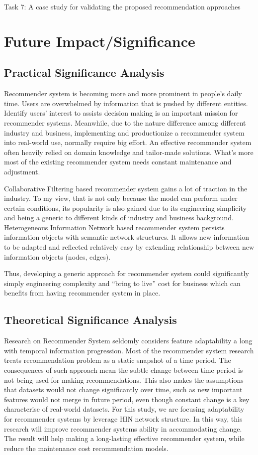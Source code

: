 \documentclass[12pt,a4 paper,title page]{article}
\begin{document}
Task 7:  A case study for validating the proposed recommendation approaches 



\section{Future Impact/Significance}

\subsection{Practical Significance Analysis}
Recommender system is becoming more and more prominent in people's daily time. Users are overwhelmed by information that is pushed by different entities. Identify users' interest to assists decision making is an important mission for recommender systems. Meanwhile, due to the nature difference among different industry and business, implementing and productionize a recommender system into real-world use, normally require big effort. An effective recommender system often heavily relied on domain knowledge and tailor-made solutions. What's more most of the existing recommender system needs constant maintenance and adjustment.  

Collaborative Filtering based recommender system gains a lot of traction in the industry. To my view, that is not only because the model can perform under certain conditions, its popularity is also gained due to its engineering simplicity and being a generic to different kinds of industry and business background. Heterogeneous Information Network based recommender system persists information objects with semantic network structures. It allows new information to be adapted and reflected relatively easy by extending relationship between new information objects (nodes, edges).  

Thus, developing a generic approach for recommender system could significantly simply engineering complexity and “bring to live” cost for business which can benefits from having recommender system in place. 

\subsection{Theoretical Significance Analysis}
Research on Recommender System seldomly considers feature adaptability a long with temporal information progression. Most of the recommender system research treats recommendation problem as a static snapshot of a time period. The consequences of such approach mean the subtle change between time period is not being used for making recommendations. This also makes the assumptions that datasets would not change significantly over time, such as new important features would not merge in future period, even though constant change is a key characterise of real-world datasets. For this study, we are focusing adaptability for recommender systems by leverage HIN network structure.  In this way, this research will improve recommender systems ability in accommodating change. The result will help making a long-lasting effective recommender system, while reduce the maintenance cost recommendation models. 

\clearpage


\end{document}
